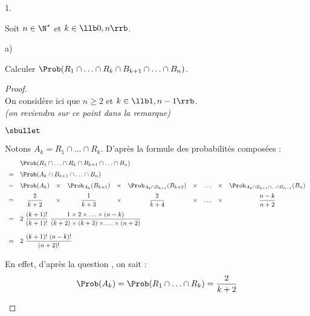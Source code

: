 \begin{noliste}{1.}
\item Soit $n \in \N^*$ et $k \in \llb 0, n \rrb$.
  \begin{noliste}{a)}
  \item Calculer $\Prob(R_1 \cap \ldots \cap R_k \cap B_{k+1} \cap
    \ldots \cap B_n)$.

    \begin{proof}~\\
      On considère ici que $n \geq 2$ et $k \in \llb 1, n-1 \rrb$.\\
      {\it (on reviendra sur ce point dans la remarque)}
      \begin{noliste}{$\sbullet$}
      \item Notons $A_k = R_1 \cap \ldots \cap R_{k}$. D'après la
        formule des probabilités composées :
        \[
        \begin{array}{cccccccccc}
          & \multicolumn{9}{l}{\Prob(R_1 \cap \ldots \cap R_{k}
            \cap B_{k+1} \cap \ldots \cap B_n)} \\[.2cm] 
          = & \multicolumn{9}{l}{\Prob(A_{k} \cap B_{k+1} \cap
            \ldots \cap B_n)} \\[.2cm]  
          = & \Prob(A_k) & \times & \Prob_{A_k}(B_{k+1}) & \times &
          \Prob_{A_k \cap B_{k+1}}(B_{k+2}) & \times & \ldots
          & \times & \Prob_{A_k \cap B_{k+1} \cap \ldots \cap
            B_{n-1}}(B_{n}) \\[.2cm] 
          = & \dfrac{2}{k+2} & \times & \dfrac{1}{k+3} & \times &
          \dfrac{2}{k+4} & \times & \ldots & \times & 
          \dfrac{n-k}{n+2}  \\[.4cm] 
          = & \multicolumn{9}{l}{
            2 \ \dfrac{(k+1)!}{(k+1)!} \ \dfrac{1 \times 2 \times
              \ldots \times (n-k)}{(k+2) \times (k+3) \times
              \ldots \times (n+2)}
          } \\[.6cm] 
          = & \multicolumn{9}{l}{
            2 \ \dfrac{(k+1)! \ (n-k)!}{(n+2)!}
          }
        \end{array}
        \]

      \item En effet, d'après la question , on sait : 
        \[
        \Prob(A_k) = \Prob(R_1 \cap \ldots \cap R_{k}) = \dfrac{2}{k+2}
        \]


\end{noliste}
\end{proof}
\end{noliste}
\end{noliste}
